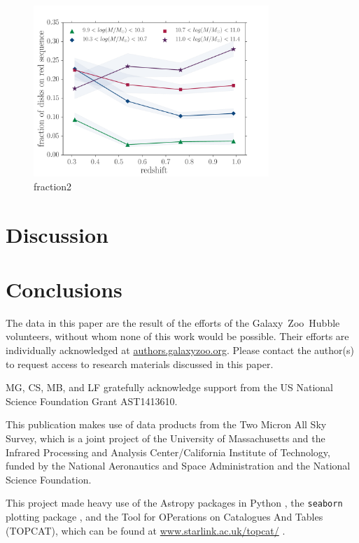 \documentclass[useAMS,usenatbib]{mn2e}
\begin{document}
\begin{figure}
\centering
\includegraphics[width=3.5in,trim={0cm 0cm 1cm 1cm},clip]{figures/red_disk_fraction2.pdf}
\caption{fraction2}
\label{fig:f2}
\end{figure}


\section{Discussion}\label{sec:Discussion}


\section{Conclusions}
\label{sec:conclusions}



The data in this paper are the result of the efforts of the Galaxy~Zoo~Hubble volunteers, without whom none of this work would be possible. Their efforts are individually acknowledged at \url{authors.galaxyzoo.org}. Please contact the author(s) to request access to research materials discussed in this paper. 


MG, CS, MB, and LF gratefully acknowledge support from the US National
Science Foundation Grant AST1413610.

This publication makes use of data products from the Two Micron All Sky Survey, which is a joint project of the University of Massachusetts and the Infrared Processing and Analysis Center/California Institute of Technology, funded by the National Aeronautics and Space Administration and the National Science Foundation.

This project made heavy use of the Astropy packages in Python \citep{Robitaille2013}, the \texttt{seaborn} plotting package \citep{Waskom}, and the Tool for OPerations on Catalogues And Tables (TOPCAT), which can be found at \url{www.starlink.ac.uk/topcat/} \citep{topcat2011}. 
\end{document}
